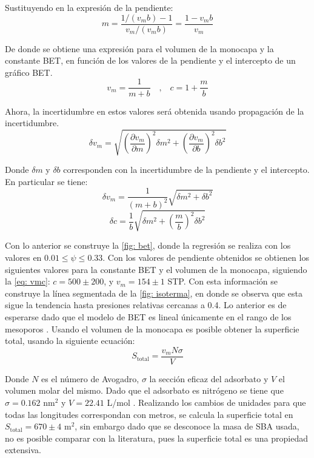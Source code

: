 \documentclass[fleqn,11pt]{SelfArx}
\begin{document}
	Sustituyendo en la expresi\'on de la pendiente:
	\begin{equation}
		m = \dfrac{1/(v_mb) - 1}{v_m/(v_mb)} = \dfrac{1-v_mb}{v_m}
	\end{equation}
	
	De donde se obtiene una expresi\'on para el volumen de la monocapa y la constante BET, en funci\'on de los valores de la pendiente y el intercepto de un gr\'afico BET.
	\begin{equation}\label{eq: vmc}
		v_m = \dfrac{1}{m+b}\quad\text{,}\quad
		c = 1 + \dfrac{m}{b}
	\end{equation}
	
	Ahora, la incertidumbre en estos valores ser\'a obtenida usando propagaci\'on de la incertidumbre.
	\begin{equation}
		\delta v_m =
		\sqrt{\left(\dfrac{\partial v_m}{\partial m}\right)^2\delta m^2 + 
		\left(\dfrac{\partial v_m}{\partial b}\right)^2\delta b^2}
	\end{equation}
	
	Donde $\delta m$ y $\delta b$ corresponden con la incertidumbre de la pendiente y el intercepto. En particular se tiene:
	\begin{equation}
		\delta v_m = \dfrac{1}{\left(m + b\right)^2}\sqrt{\delta m^2 + \delta b^2}
	\end{equation}
	\begin{equation}
		\delta c = \dfrac{1}{b}\sqrt{\delta m^2 + \left(\dfrac{m}{b}\right)^2\delta b^2}
	\end{equation}
	
	Con lo anterior se construye la \autoref{fig: bet}, donde la regresi\'on se realiza con los valores en $0.01\leq \psi \leq 0.33$. Con los valores de pendiente obtenidos se obtienen los siguientes valores para la constante BET y el volumen de la monocapa, siguiendo la \autoref{eq: vmc}: $c = 500 \pm 200$, y $v_m = 154 \pm 1$ STP. Con esta informaci\'on se construye la l\'inea segmentada de la \autoref{fig: isoterma}, en donde se observa que esta sigue la tendencia hasta presiones relativas cercanas a 0.4. Lo anterior es de esperarse dado que el modelo de BET es lineal \'unicamente en el rango de los mesoporos \cite{llewellyn2007bet}. Usando el volumen de la monocapa es posible obtener la superficie total, usando la siguiente ecuaci\'on:
	\begin{equation}
		S_{\text{total}} = \dfrac{v_mN\sigma}{V}
	\end{equation}
	
	Donde $N$ es el n\'umero de Avogadro, $\sigma$ la secci\'on eficaz del adsorbato y $V$ el volumen molar del mismo. Dado que el adsorbato es nitr\'ogeno se tiene que $\sigma = 0.162$ nm$^2$ y $V = 22.41$ L/mol \cite{ismail1992cross}. Realizando los cambios de unidades para que todas las longitudes correspondan con metros, se calcula la superficie total en $S_\text{total} = 670 \pm 4$ m$^2$, sin embargo dado que se desconoce la masa de SBA usada, no es posible comparar con la literatura, pues la superficie total es una propiedad extensiva.
	
\end{document}
